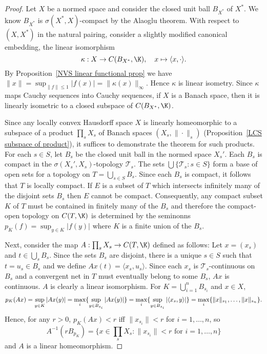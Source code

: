 \begin{proof}
Let $X$ be a normed space and consider the closed unit ball $B_{X^*}$ of $X^*$. We know $B_{X^*}$ is $\sigma(X^*,X)$-compact by the Alaoglu theorem. With respect to $(X,X^*)$ in the natural pairing, consider a slightly modified canonical embedding, the linear isomorphism
\[\kappa:X\to C(B_{X^*},\K),\quad x\mapsto\langle x,\cdot\rangle.\]
By Proposition~\ref{NVS linear functional prop} we have $\|x\|=\sup_{\|f\|\leq 1}|f(x)|=\|\kappa(x)\|_\infty$. Hence $\kappa$ is linear isometry. Since $\kappa$ maps Cauchy sequences into Cauchy sequences, if $X$ is a Banach space, then it is linearly isometric to a closed subspace of $C(B_{X^*},\K)$.\par
Since any locally convex Hausdorff space $X$ is linearly homeomorphic to a subspace of a product $\prod_sX_s$ of Banach spaces $(X_s,\|\cdot\|_s)$ (Proposition~\ref{LCS subspace of product}), it suffices to demonstrate the theorem for such products. For each $s\in S$, let $B_s$ be the closed unit ball in the normed space $X_s'$. Each $B_s$ is compact in the $\sigma(X_s',X_s)$-topology $\mathcal{T}_s$. The sets $\bigcup\{\mathcal{T}_s:s\in S\}$ form a base of open sets for a topology on $T=\bigcup_{s\in S}B_s$. Since each $B_s$ is compact, it follows that $T$ is locally compact. If $E$ is a subset of $T$ which intersects infinitely many of the disjoint sets $B_s$ then $E$ cannot be compact. Consequently, any compact subset $K$ of $T$ must be contained in finitely many of the $B_s$ and therefore the compact-open topology on $C(T,\K)$ is determined by the seminonns $p_K(f)=\sup_{y\in K}|f(y)|$ where $K$ is a finite union of the $B_s$.\par
Next, consider the map $A:\prod_sX_s\to C(T,\K)$ defined as follows: Let $x=(x_s)$ and $t\in\bigcup_sB_s$. Since the sets $B_s$ are disjoint, there is a unique $s\in S$ such that $t=u_s\in B_s$ and we define $Ax(t)=\langle x_s,u_s\rangle$. Since each $x_s$ is $\mathcal{T}_s$-continuous on $B_s$ and a convergent net in $T$ must eventually belong to some $B_s$, $Ax$ is continuous. $A$ is clearly a linear isomorphism. For $K=\bigcup_{i=1}^{n}B_{s_i}$ and $x\in X$,
\begin{equation*}\small
\begin{aligned}
p_K(Ax)=\sup_{y\in K}|Ax(y)|=\max_{i}\{\sup_{y\in B_{s_i}}|Ax(y)|\}=\max_{i}\{\sup_{y\in B_{s_i}}|\langle x_s,y\rangle|\}=\max_i\{\|x\|_{s_1},\dots,\|x\|_{s_n}\}.
\end{aligned}
\end{equation*}
Hence, for any $r>0$, $p_K(Ax)<r$ iff $\|x_{s_i}\|<r$ for $i=1,\dots,n$, so
\[A^{-1}(rB_{p_K})=\{x\in\prod_sX_s:\|x_{s_i}\|<r\text{ for }i=1,\dots,n\}\]
and $A$ is a linear homeomorphism.
\end{proof}
